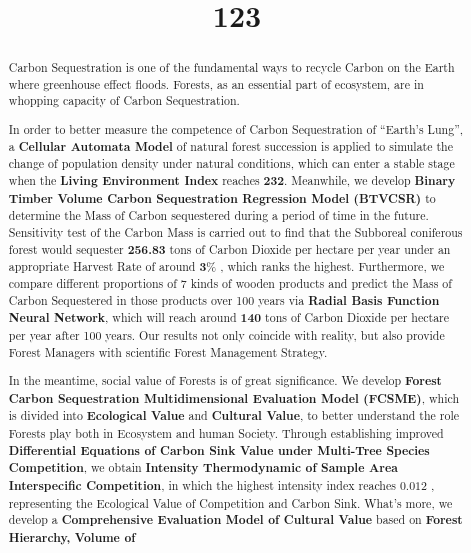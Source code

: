 \documentclass{mcmthesis}
\title{123}
\numberwithin{figure}{section}
\numberwithin{table}{section}
\numberwithin{equation}{section}
\begin{document}
\renewcommand{\algorithmicrequire}{\textbf{Input:}}  %
\renewcommand{\algorithmicensure}{\textbf{Output:}} %
\begin{abstract}

  Carbon Sequestration is one of the fundamental ways to recycle Carbon on the Earth where 
  greenhouse effect floods. Forests, as an essential part of ecosystem, are 
  in whopping capacity of Carbon Sequestration. 
  \par
  In order to better measure the competence of Carbon Sequestration of “Earth's 
  Lung”, a \textbf{Cellular Automata Model} of natural forest succession is applied to 
  simulate the change of population density under natural conditions, which can 
  enter a stable stage when the \textbf{Living Environment Index} reaches \textbf{232}. 
  Meanwhile, we develop \textbf{Binary Timber Volume Carbon Sequestration Regression Model (BTVCSR)} to 
  determine the Mass of Carbon sequestered during a period of time in the future. 
  Sensitivity test of the Carbon Mass is carried out to find that the Subboreal 
  coniferous forest would sequester \textbf{256.83} tons of Carbon Dioxide per hectare per year 
  under an appropriate Harvest Rate of around $ \bm{3\%} $ , which ranks the highest. 
  Furthermore, we compare different proportions of 7 kinds of wooden products 
  and predict the Mass of Carbon Sequestered in those products over 100 years 
  via \textbf{Radial Basis Function Neural Network}, which will reach around 
  \textbf{140} tons of Carbon Dioxide per hectare per year after 100 years.  Our results not only coincide with reality, 
  but also provide Forest Managers with scientific Forest Management Strategy.
  \par
  In the meantime, social value of Forests is of great significance. We develop \textbf{Forest Carbon 
  Sequestration Multidimensional Evaluation Model (FCSME)}, which is 
  divided into \textbf{Ecological Value} and \textbf{Cultural Value}, to better understand
  the role Forests play both in Ecosystem and human Society. Through establishing improved 
 \textbf{ Differential Equations of Carbon Sink Value under Multi-Tree Species Competition},
  we obtain \textbf{Intensity Thermodynamic of Sample Area Interspecific Competition}, 
  in which the highest intensity index reaches $ \bm{0.012} $ , representing the Ecological 
  Value of Competition and Carbon Sink. What's more, we develop a \textbf{Comprehensive 
  Evaluation Model of Cultural Value} based on\textbf{ Forest Hierarchy, Volume of 
}
\end{abstract}
\end{document}
